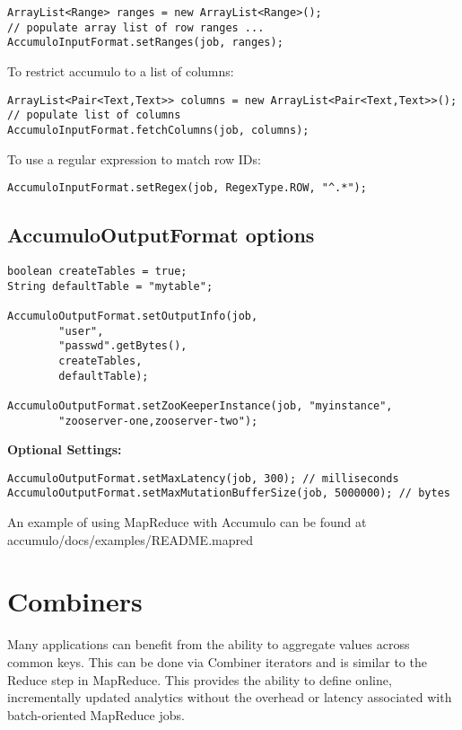 \small
\begin{verbatim}
ArrayList<Range> ranges = new ArrayList<Range>();
// populate array list of row ranges ...
AccumuloInputFormat.setRanges(job, ranges);
\end{verbatim}
\normalsize

To restrict accumulo to a list of columns:

\small
\begin{verbatim}
ArrayList<Pair<Text,Text>> columns = new ArrayList<Pair<Text,Text>>();
// populate list of columns
AccumuloInputFormat.fetchColumns(job, columns);
\end{verbatim}
\normalsize

To use a regular expression to match row IDs:

\small
\begin{verbatim}
AccumuloInputFormat.setRegex(job, RegexType.ROW, "^.*");
\end{verbatim}
\normalsize

\subsection{AccumuloOutputFormat options}

\small
\begin{verbatim}
boolean createTables = true;
String defaultTable = "mytable";

AccumuloOutputFormat.setOutputInfo(job,
        "user",
        "passwd".getBytes(),
        createTables,
        defaultTable);

AccumuloOutputFormat.setZooKeeperInstance(job, "myinstance",
        "zooserver-one,zooserver-two");
\end{verbatim}

\Large
\textbf{Optional Settings:}
\normalsize

\small
\begin{verbatim}
AccumuloOutputFormat.setMaxLatency(job, 300); // milliseconds
AccumuloOutputFormat.setMaxMutationBufferSize(job, 5000000); // bytes
\end{verbatim}
\normalsize

An example of using MapReduce with Accumulo can be found at\\
accumulo/docs/examples/README.mapred

\section{Combiners}

Many applications can benefit from the ability to aggregate values across common
keys. This can be done via Combiner iterators and is similar to the Reduce step in
MapReduce. This provides the ability to define online, incrementally updated
analytics without the overhead or latency associated with batch-oriented
MapReduce jobs.

